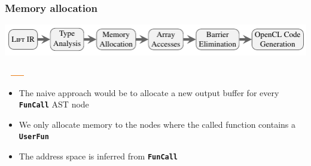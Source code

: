 \documentclass[10pt]{beamer}
\newcommand{\code}[1]{\textbf{\texttt{#1}}}
\begin{document}
\begin{frame}[t]
\frametitle{Memory allocation}
    \vspace{-1cm}
    \begin{block}{}
        \begin{center}
            \includegraphics[width=1\textwidth]{../images/compilation_stages.pdf}
        \end{center}
        \vspace{-1.05cm}
        \hspace{3.36cm}
        \includegraphics[width=1.1cm, height=0.03cm]{../images/orange_bar.png}
        \vspace{.45cm}
    \end{block}
    \vspace{-0.5cm}
\begin{itemize}
	\item The naive approach would be to allocate a new output buffer for every \code{FunCall} AST node
	\item We only allocate memory to the nodes where the called function contains a \code{UserFun}
	\item The address space is inferred from \code{FunCall}
\end{itemize}
\end{frame}
\end{document}
